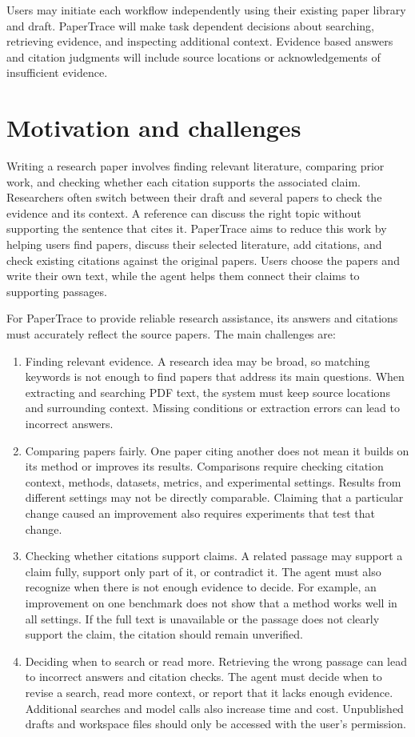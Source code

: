 \documentclass{article}
\begin{document}
Users may initiate each workflow independently using their existing paper library and draft. PaperTrace will make task dependent decisions about searching, retrieving evidence, and inspecting additional context. Evidence based answers and citation judgments will include source locations or acknowledgements of insufficient evidence.

\section{Motivation and challenges}

Writing a research paper involves finding relevant literature, comparing prior work, and checking whether each citation supports the associated claim. Researchers often switch between their draft and several papers to check the evidence and its context. A reference can discuss the right topic without supporting the sentence that cites it. PaperTrace aims to reduce this work by helping users find papers, discuss their selected literature, add citations, and check existing citations against the original papers. Users choose the papers and write their own text, while the agent helps them connect their claims to supporting passages.

For PaperTrace to provide reliable research assistance, its answers and citations must accurately reflect the source papers. The main challenges are:
\begin{enumerate}
    \item Finding relevant evidence. A research idea may be broad, so matching keywords is not enough to find papers that address its main questions. When extracting and searching PDF text, the system must keep source locations and surrounding context. Missing conditions or extraction errors can lead to incorrect answers.
    \item Comparing papers fairly. One paper citing another does not mean it builds on its method or improves its results. Comparisons require checking citation context, methods, datasets, metrics, and experimental settings. Results from different settings may not be directly comparable. Claiming that a particular change caused an improvement also requires experiments that test that change.
    \item Checking whether citations support claims. A related passage may support a claim fully, support only part of it, or contradict it. The agent must also recognize when there is not enough evidence to decide. For example, an improvement on one benchmark does not show that a method works well in all settings. If the full text is unavailable or the passage does not clearly support the claim, the citation should remain unverified.
    \item Deciding when to search or read more. Retrieving the wrong passage can lead to incorrect answers and citation checks. The agent must decide when to revise a search, read more context, or report that it lacks enough evidence. Additional searches and model calls also increase time and cost. Unpublished drafts and workspace files should only be accessed with the user's permission.
\end{enumerate}
\end{document}
